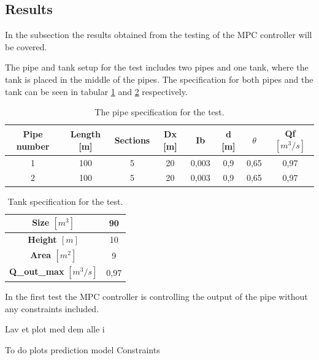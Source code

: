 \subsection*{Results}
In the subsection the results obtained from the testing of the MPC controller will be covered.

The pipe and tank setup for the test includes two pipes and one tank, where the tank is placed in the middle of the pipes. The specification for both pipes and the tank can be seen in tabular \ref{tab:pipe_data_for_mpc_test} and \ref{tab:tank_data_for_mpc_test} respectively.

\begin{table}[H]
\centering
\begin{tabular}{|c|c|c|c|c|c|c|c|}
\hline
\textbf{Pipe number} & \textbf{Length} [m] & \textbf{Sections} & \textbf{Dx} [m] & \textbf{Ib} & \textbf{d} [m] & \textbf{$\theta$} & \textbf{Qf $[m^3/s]$} \\ \hline
1&100             & 5                 & 20          & 0,003       & 0,9        & 0,65              & 0,97        \\ \hline
2&100             & 5                 & 20          & 0,003       & 0,9        & 0,65              & 0,97        \\ \hline
\end{tabular}
\caption{The pipe specification for the test.}
\label{tab:pipe_data_for_mpc_test}
\end{table}
\begin{table}[H]
\centering
\begin{tabular}{|c|c|}
\hline
\textbf{Size $[m^3]$}        & 90   \\ \hline
\textbf{Height $[m]$}      & 10   \\ \hline
\textbf{Area $[m^2]$}        & 9    \\ \hline
\textbf{Q\_out\_max} $[m^3/s]$& 0,97 \\ \hline
\end{tabular}
\caption{Tank specification for the test.}
\label{tab:tank_data_for_mpc_test}
\end{table}

In the first test the MPC controller is controlling the output of the pipe without any constraints included. 

Lav et plot med dem alle i 

To do
	plots
	prediction model
	Constraints
